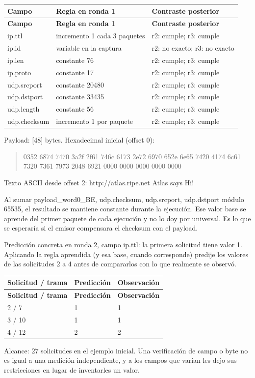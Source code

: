 \begingroup
\fontsize{9}{11}\selectfont
\addtocounter{table}{-1}
\begin{longtable}{p{3.1cm}p{5.8cm}p{5.1cm}}
\toprule
\textbf{Campo} & \textbf{Regla en ronda 1} & \textbf{Contraste posterior} \\ \midrule
\endfirsthead
\toprule
\textbf{Campo} & \textbf{Regla en ronda 1} & \textbf{Contraste posterior} \\ \midrule
\endhead
ip.ttl & incremento 1 cada 3 paquetes & r2: cumple; r3: cumple \\
ip.id & variable en la captura & r2: no exacto; r3: no exacto \\
ip.len & constante 76 & r2: cumple; r3: cumple \\
ip.proto & constante 17 & r2: cumple; r3: cumple \\
udp.srcport & constante 20480 & r2: cumple; r3: cumple \\
udp.dstport & constante 33435 & r2: cumple; r3: cumple \\
udp.length & constante 56 & r2: cumple; r3: cumple \\
udp.checksum & incremento 1 por paquete & r2: cumple; r3: cumple \\
\bottomrule
\end{longtable}
\endgroup
Payload: [48] bytes. Hexadecimal inicial (offset 0):

\begin{quote}\ttfamily\footnotesize\raggedright 0352 6874 7470 3a2f 2f61 746c 6173 2e72 6970 652e 6e65 7420 4174 6c61 7320 7361 7973 2048 6921 0000 0000 0000 0000 0000\end{quote}
Texto ASCII desde offset 2: http://atlas.ripe.net Atlas says Hi!

Al sumar payload\_\allowbreak{}word0\_\allowbreak{}BE, udp.checksum, udp.srcport, udp.dstport módulo 65535, el resultado se mantiene constante durante la ejecución. Ese valor base se aprende del primer paquete de cada ejecución y no lo doy por universal. Es lo que se esperaría si el emisor compensara el checksum con el payload.

Predicción concreta en ronda 2, campo ip.ttl: la primera solicitud tiene valor 1. Aplicando la regla aprendida (y esa base, cuando corresponde) predije los valores de las solicitudes 2 a 4 antes de compararlos con lo que realmente se observó.

\begingroup
\fontsize{9}{11}\selectfont
\addtocounter{table}{-1}
\begin{longtable}{p{3.2cm}p{5.1cm}p{5.1cm}}
\toprule
\textbf{Solicitud / trama} & \textbf{Predicción} & \textbf{Observación} \\ \midrule
\endfirsthead
\toprule
\textbf{Solicitud / trama} & \textbf{Predicción} & \textbf{Observación} \\ \midrule
\endhead
2 / 7 & 1 & 1 \\
3 / 10 & 1 & 1 \\
4 / 12 & 2 & 2 \\
\bottomrule
\end{longtable}
\endgroup
Alcance: 27 solicitudes en el ejemplo inicial. Una verificación de campo o byte no es igual a una medición independiente, y a los campos que varían les dejo sus restricciones en lugar de inventarles un valor.

